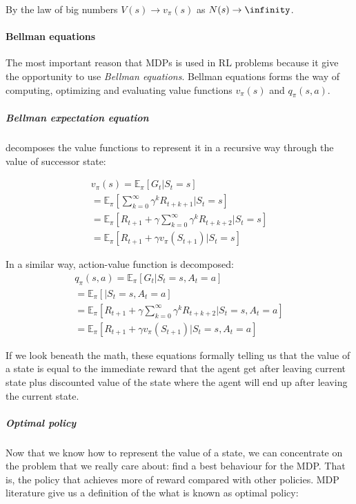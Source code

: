 By the law of big numbers $V(s) \rightarrow v_{\pi}(s)$ as $N(s) \rightarrow \infinity$.



\paragraph{Bellman equations} The most important reason that MDPs is used in RL problems because
it give the opportunity to use \emph{Bellman equations}. Bellman equations forms the way
of computing, optimizing and evaluating value functions $v_{\pi}(s)$ and $q_{\pi}(s, a)$.

\subparagraph{Bellman expectation equation} decomposes the value functions to represent it
in a recursive way through the value of successor state:

\begin{align*}
	v_{\pi}(s) = \mathbb{E}_{\pi} [G_t |S_t = s] \\
		= \mathbb{E}_{\pi} [\sum_{k=0}^{\infty} \gamma^k R_{t+k+1} |S_t = s] \\
		= \mathbb{E}_{\pi} [R_{t+1} + \gamma \sum_{k=0}^{\infty} \gamma^k R_{t+k+2} |S_t = s] \\
		= \mathbb{E}_{\pi} [R_{t+1} + \gamma v_{\pi}(S_{t+1}) | S_t = s]
\end{align*}

In a similar way, action-value function is decomposed:
\begin{align*}
	q_{\pi}(s, a) = \mathbb{E}_{\pi} [G_t |S_t = s, A_t = a] \\
		= \mathbb{E}_{\pi} [ |S_t = s, A_t = a] \\
		= \mathbb{E}_{\pi} [R_{t+1} + \gamma \sum_{k=0}^{\infty} \gamma^k R_{t+k+2} |S_t = s, A_t = a] \\
		= \mathbb{E}_{\pi} [R_{t+1} + \gamma v_{\pi}(S_{t+1}) | S_t = s, A_t = a]
\end{align*}

If we look beneath the math, these equations formally telling us that the value of a state is equal to the
immediate reward that the agent get after leaving current state plus discounted value
of the state where the agent will end up after leaving the current state.



\subparagraph{Optimal policy}

Now that we know how to represent the value of
a state, we can concentrate on the problem that we really care about:
find a best behaviour for the MDP. That is, the policy that achieves more of reward
compared with other policies.
MDP literature give us a definition of the what is
known as optimal policy:

